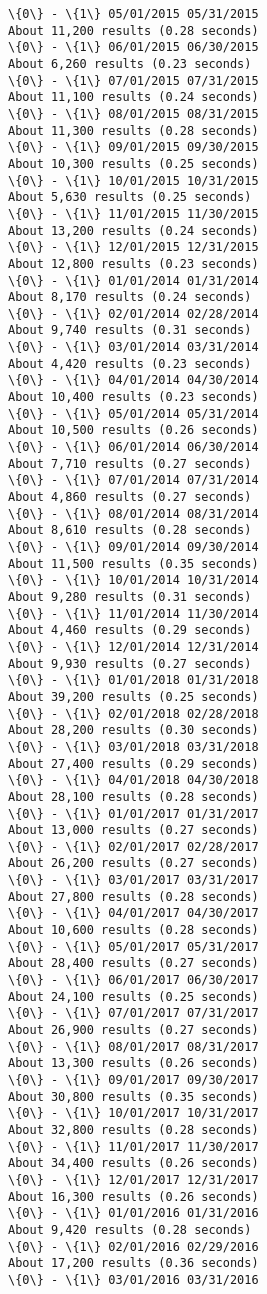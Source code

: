 \documentclass[11pt]{article}
\begin{document}
\begin{Verbatim}[commandchars=\\\{\}]
\{0\} - \{1\} 05/01/2015 05/31/2015
About 11,200 results (0.28 seconds) 
\{0\} - \{1\} 06/01/2015 06/30/2015
About 6,260 results (0.23 seconds) 
\{0\} - \{1\} 07/01/2015 07/31/2015
About 11,100 results (0.24 seconds) 
\{0\} - \{1\} 08/01/2015 08/31/2015
About 11,300 results (0.28 seconds) 
\{0\} - \{1\} 09/01/2015 09/30/2015
About 10,300 results (0.25 seconds) 
\{0\} - \{1\} 10/01/2015 10/31/2015
About 5,630 results (0.25 seconds) 
\{0\} - \{1\} 11/01/2015 11/30/2015
About 13,200 results (0.24 seconds) 
\{0\} - \{1\} 12/01/2015 12/31/2015
About 12,800 results (0.23 seconds) 
\{0\} - \{1\} 01/01/2014 01/31/2014
About 8,170 results (0.24 seconds) 
\{0\} - \{1\} 02/01/2014 02/28/2014
About 9,740 results (0.31 seconds) 
\{0\} - \{1\} 03/01/2014 03/31/2014
About 4,420 results (0.23 seconds) 
\{0\} - \{1\} 04/01/2014 04/30/2014
About 10,400 results (0.23 seconds) 
\{0\} - \{1\} 05/01/2014 05/31/2014
About 10,500 results (0.26 seconds) 
\{0\} - \{1\} 06/01/2014 06/30/2014
About 7,710 results (0.27 seconds) 
\{0\} - \{1\} 07/01/2014 07/31/2014
About 4,860 results (0.27 seconds) 
\{0\} - \{1\} 08/01/2014 08/31/2014
About 8,610 results (0.28 seconds) 
\{0\} - \{1\} 09/01/2014 09/30/2014
About 11,500 results (0.35 seconds) 
\{0\} - \{1\} 10/01/2014 10/31/2014
About 9,280 results (0.31 seconds) 
\{0\} - \{1\} 11/01/2014 11/30/2014
About 4,460 results (0.29 seconds) 
\{0\} - \{1\} 12/01/2014 12/31/2014
About 9,930 results (0.27 seconds) 
\{0\} - \{1\} 01/01/2018 01/31/2018
About 39,200 results (0.25 seconds) 
\{0\} - \{1\} 02/01/2018 02/28/2018
About 28,200 results (0.30 seconds) 
\{0\} - \{1\} 03/01/2018 03/31/2018
About 27,400 results (0.29 seconds) 
\{0\} - \{1\} 04/01/2018 04/30/2018
About 28,100 results (0.28 seconds) 
\{0\} - \{1\} 01/01/2017 01/31/2017
About 13,000 results (0.27 seconds) 
\{0\} - \{1\} 02/01/2017 02/28/2017
About 26,200 results (0.27 seconds) 
\{0\} - \{1\} 03/01/2017 03/31/2017
About 27,800 results (0.28 seconds) 
\{0\} - \{1\} 04/01/2017 04/30/2017
About 10,600 results (0.28 seconds) 
\{0\} - \{1\} 05/01/2017 05/31/2017
About 28,400 results (0.27 seconds) 
\{0\} - \{1\} 06/01/2017 06/30/2017
About 24,100 results (0.25 seconds) 
\{0\} - \{1\} 07/01/2017 07/31/2017
About 26,900 results (0.27 seconds) 
\{0\} - \{1\} 08/01/2017 08/31/2017
About 13,300 results (0.26 seconds) 
\{0\} - \{1\} 09/01/2017 09/30/2017
About 30,800 results (0.35 seconds) 
\{0\} - \{1\} 10/01/2017 10/31/2017
About 32,800 results (0.28 seconds) 
\{0\} - \{1\} 11/01/2017 11/30/2017
About 34,400 results (0.26 seconds) 
\{0\} - \{1\} 12/01/2017 12/31/2017
About 16,300 results (0.26 seconds) 
\{0\} - \{1\} 01/01/2016 01/31/2016
About 9,420 results (0.28 seconds) 
\{0\} - \{1\} 02/01/2016 02/29/2016
About 17,200 results (0.36 seconds) 
\{0\} - \{1\} 03/01/2016 03/31/2016


\end{Verbatim}
\end{document}
